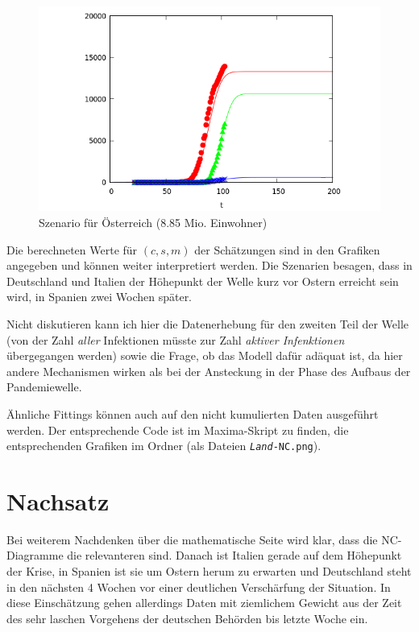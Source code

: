 \documentclass[a4paper,11pt]{article}
\begin{document}
\begin{figure}
  \begin{center}
  \includegraphics[width=.8\textwidth]{Austria.png}
    \caption{Szenario für Österreich (8.85 Mio. Einwohner)}
\end{center}
\end{figure}

Die berechneten Werte für $(c,s,m)$ der Schätzungen sind in den Grafiken
angegeben und können weiter interpretiert werden.  Die Szenarien besagen, dass
in Deutschland und Italien der Höhepunkt der Welle kurz vor Ostern erreicht
sein wird, in Spanien zwei Wochen später.

Nicht diskutieren kann ich hier die Datenerhebung für den zweiten Teil der
Welle (von der Zahl \emph{aller} Infektionen müsste zur Zahl \emph{aktiver
  Infenktionen} übergegangen werden) sowie die Frage, ob das Modell dafür
adäquat ist, da hier andere Mechanismen wirken als bei der Ansteckung in der
Phase des Aufbaus der Pandemiewelle.

Ähnliche Fittings können auch auf den nicht kumulierten Daten ausgeführt
werden. Der entsprechende Code ist im Maxima-Skript zu finden, die
entsprechenden Grafiken im Ordner (als Dateien \texttt{\emph{Land}-NC.png}).

\section{Nachsatz}

Bei weiterem Nachdenken über die mathematische Seite wird klar, dass die
NC-Diagramme die relevanteren sind. Danach ist Italien gerade auf dem
Höhepunkt der Krise, in Spanien ist sie um Ostern herum zu erwarten und
Deutschland steht in den nächsten 4 Wochen vor einer deutlichen Verschärfung
der Situation. In diese Einschätzung gehen allerdings Daten mit ziemlichem
Gewicht aus der Zeit des sehr laschen Vorgehens der deutschen Behörden bis
letzte Woche ein.
\end{document}
